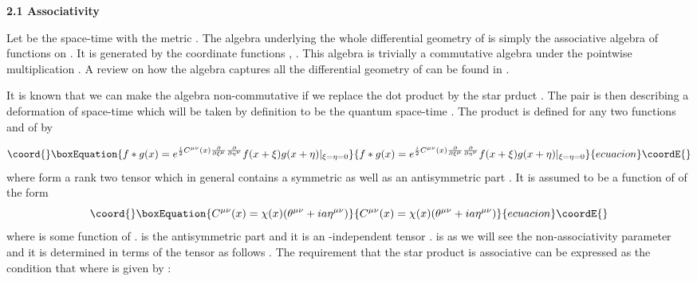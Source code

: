 \documentclass[a4paper,12pt]{article}
\let\oldtheequation=\theequation
\def\doteqs#1{\setcounter{equation}{0}
            \def\theequation{{#1}.\oldtheequation}}
\newcounter{sxn}
\def\sx#1{\addtocounter{sxn}{1}
\medskip \goodbreak
\noindent{\large\bf
\centerline{\thesxn.~~#1}} \nobreak \medskip}
\def\sxn#1{\sx{#1} \doteqs{\thesxn}}
\begin{document}
\sxn{The Star Product}

\vskip 5mm \noindent
{\bf 2.1 Associativity}
\vskip 5mm \noindent

Let \coordHE{} be the space-time with the metric
\coordHE{} . The algebra underlying the
whole differential geometry of \coordHE{} is simply the associative
algebra \coordHE{} of functions \coordHE{} on \coordHE{} . It is generated by
the coordinate functions \coordHE{} , \coordHE{} . This
algebra is trivially a commutative algebra under the pointwise
multiplication . A review on how the algebra \coordHE{}
captures all the differential geometry of \coordHE{} can be found in
\cite{coq,madore,landi,varilly} .

It is known that we can make the algebra \coordHE{}
non-commutative if we replace the dot product
 by the star prduct \cite{kon} . The pair \coordHE{} is then describing a deformation \coordHE{} of space-time which
  will be
 taken
 by definition to be the quantum space-time . The \myHighlight{$*$}\coordHE{} product is defined for any two functions \coordHE{} and \coordHE{}
 of \coordHE{} by \cite{witten}

\begin{equation}\coord{}\boxEquation{
f*g(x)=e^{\frac{i}{2}{C}^{{\mu}{\nu}}(x)\frac{\partial}{\partial{\xi}^{\mu}}\frac{\partial}{\partial{\eta}^{\nu}}}f(x+{\xi})g(x+{\eta})|_{{\xi}={\eta}=0}
}{
f*g(x)=e^{\frac{i}{2}{C}^{{\mu}{\nu}}(x)\frac{\partial}{\partial{\xi}^{\mu}}\frac{\partial}{\partial{\eta}^{\nu}}}f(x+{\xi})g(x+{\eta})|_{{\xi}={\eta}=0}
}{ecuacion}\coordE{}\end{equation}
where \coordHE{} form a rank two tensor \coordHE{} which in
general contains a symmetric as well as an antisymmetric
part\cite{peter} . It is assumed to be a function of \coordHE{} of the
form
\begin{equation}\coord{}\boxEquation{
C^{{\mu}{\nu}}(x)={\chi}(x)({\theta}^{{\mu}{\nu}} +
 i a {\eta}^{{\mu}{\nu}})
}{
C^{{\mu}{\nu}}(x)={\chi}(x)({\theta}^{{\mu}{\nu}} +
 i a {\eta}^{{\mu}{\nu}})
}{ecuacion}\coordE{}\end{equation}
where \coordHE{} is some function of \coordHE{} . \myHighlight{${\theta}$}\coordHE{} is the
antisymmetric part and it is an \coordHE{}-independent tensor . \coordHE{} is
as we will see the non-associativity parameter and it is
determined in terms of the tensor \myHighlight{$\theta$}\coordHE{} as follows . The
requirement that the star product \coordHE{} is associative can be
expressed as the condition that \coordHE{} where \coordHE{} is given by :
\end{document}
